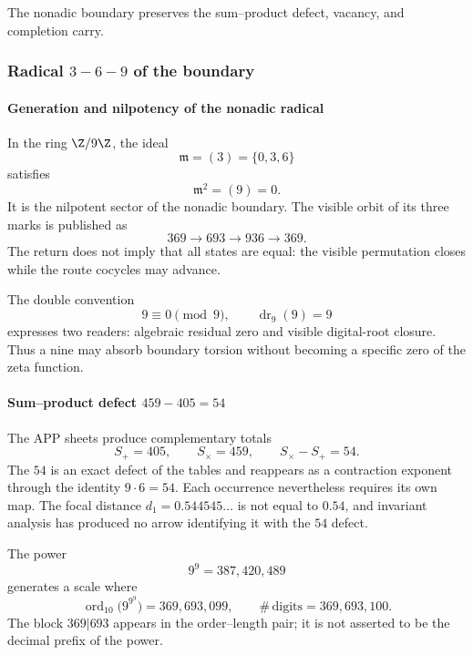 \noindent The nonadic boundary preserves the sum--product defect, vacancy, and completion carry.\par\medskip

\subsubsection{Radical \(3\! -\! 6\! -\! 9\) of the boundary}

\paragraph{Generation and nilpotency of the nonadic radical}

In the ring \(\Z/9\Z\), the ideal
\begin{equation}
\mathfrak m=(3)=\{0,3,6\}
\label{eq:radical-369}
\end{equation}
satisfies
\begin{equation}
\mathfrak m^2=(9)=0.
\label{eq:m-square-zero}
\end{equation}
It is the nilpotent sector of the nonadic boundary. The visible orbit of its three
marks is published as
\[
369\longrightarrow693\longrightarrow936\longrightarrow369.
\]
The return does not imply that all states are equal: the visible
permutation closes while the route cocycles may advance.

The double convention
\[
9\equiv0\pmod9,
\qquad
\operatorname{dr}_9(9)=9
\]
expresses two readers: algebraic residual zero and visible digital-root
closure. Thus a nine may absorb boundary torsion without becoming
a specific zero of the zeta function.

\paragraph{Sum--product defect \(459-405=54\)}

The APP sheets produce complementary totals
\[
S_+=405,\qquad S_\times=459,\qquad S_\times-S_+=54.
\]
The \(54\) is an exact defect of the tables and reappears as a contraction
exponent through the identity \(9\cdot6=54\). Each occurrence nevertheless
requires its own map. The focal distance \(d_1=0.544545\ldots\) is not equal to
\(0.54\), and invariant analysis has produced no arrow identifying it with
the \(54\) defect.

The power
\[
9^9=387,420,489
\]
generates a scale where
\begin{equation}
\operatorname{ord}_{10}\bigl(9^{9^9}\bigr)=369,693,099,
\qquad
\#\,\text{digits}=369,693,100.
\label{eq:369693}
\end{equation}
The block \(369|693\) appears in the order--length pair; it is not asserted to be
the decimal prefix of the power.

